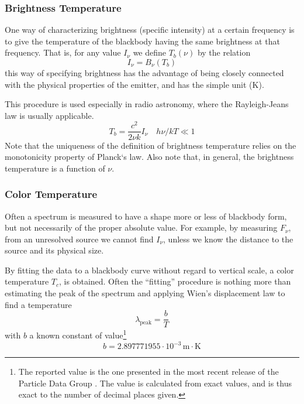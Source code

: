 \subsubsection*{Brightness Temperature}

One way of characterizing brightness (specific intensity) at a certain frequency is to give the temperature of the blackbody having the same brightness at that frequency. That is, for any value $I_{\nu}$ we define $T_{b}(\nu)$ by the relation
\begin{equation*}
    I_{\nu} = B_{\nu}(T_{b})   
\end{equation*}
this way of specifying brightness has the advantage of being closely connected with the physical properties of the emitter, and has the simple unit (K).
\par This procedure is used especially in radio astronomy, where the Rayleigh-Jeans law is usually applicable.
\begin{equation}
    T_{b} = \frac{c^{2}}{2\nu k}I_{\nu} \quad h\nu/kT \ll 1
\end{equation}
Note that the uniqueness of the definition of brightness temperature relies on the monotonicity property of Planck‘s law. Also note that, in general, the brightness temperature is a function of $\nu$.

\subsubsection*{Color Temperature}

Often a spectrum is measured to have a shape more or less of blackbody form, but not necessarily of the proper absolute value. For example, by measuring $F_{\nu}$, from an unresolved source we cannot find $I_{\nu}$, unless we know the distance to the source and its physical size.
\par By fitting the data to a blackbody curve without regard to vertical scale, a color temperature $T_{c}$, is obtained. Often the “fitting” procedure is nothing more than estimating the peak of the spectrum and applying Wien’s displacement law to find a temperature
\begin{equation}
    \lambda_{\text{peak}} = \frac{b}{T}
	\label{eq:wien_dl}
\end{equation}
with $b$ a known constant of value\footnote{The reported value is the one presented in the most recent release of the Particle Data Group \cite{ParticleDataGroup2024}. The value is calculated from exact values, and is thus exact to the number of decimal places given.} 
\begin{equation}
    b = 2.897771955\cdot 10^{-3}\,\text{m}\cdot\text{K}
\end{equation}

